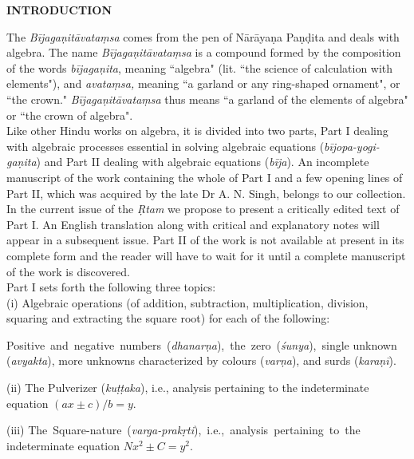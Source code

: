 \documentclass[11pt, openany]{book}
\begin{document}
 \label{intro}
\begin{center}
\textbf{INTRODUCTION}
\end{center}

The \textit{Bījagaṇitāvataṃsa} comes from the pen of Nārāyaṇa Paṇḍita and deals with algebra. The name \textit{Bījagaṇitāvataṃsa} is a compound formed by the composition of the words \textit{bījagaṇita}, meaning ``algebra" (lit. ``the science of calculation with elements"), and \textit{avataṃsa,}
meaning ``a garland or any ring-shaped ornament", or ``the crown." \textit{Bījagaṇitāvataṃsa} thus means ``a garland of the elements of algebra" or ``the crown of algebra".\\

Like other Hindu works on algebra, it is divided into two parts, Part I dealing with algebraic processes essential in solving algebraic equations (\textit{bījopa-yogi-gaṇita}) and Part II dealing with algebraic equations (\textit{bīja}). An incomplete manuscript of the work containing the whole of Part I and a few opening lines of Part II, which was acquired by the late Dr A. N. Singh, belongs to our collection. In the current issue of the \textit{Ṛtam} we propose to present a critically edited text of Part I. An English translation along with critical and explanatory notes will appear in a subsequent issue. Part II of the work is not available at present in its complete form and the reader will have to wait for it until a complete manuscript of the work is discovered.\\

Part I sets forth the following three topics:\\

(i) Algebraic operations (of addition, subtraction, multiplication, division, squaring and extracting the square root) for each of the following:
\vspace{2mm}

Positive \,and \,negative \,numbers \,(\textit{dhanarṇa}), \,the \,zero \,(\textit{śunya}), \,single unknown (\textit{avyakta}), more unknowns characterized by colours (\textit{varṇa}), and surds (\textit{karaṇī}).
\vspace{2mm}

(ii) The Pulverizer (\textit{kuṭṭaka}), i.e., analysis pertaining to the indeterminate equation $(ax \pm c)/b = y$.
\vspace{2mm}

(iii) The \,Square-nature \,(\textit{varga-prakṛti}), \,i.e., \,analysis \,pertaining \,to \,the indeterminate equation $Nx^2 \pm C = y^2$.\\
\end{document}
